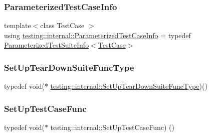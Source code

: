 \mbox{\label{namespacetesting_1_1internal_aac31682b6b41997d6cc610a5787dc8bc}} 
\subsubsection{\texorpdfstring{ParameterizedTestCaseInfo}{ParameterizedTestCaseInfo}}
{\footnotesize\ttfamily template$<$class Test\+Case $>$ \\
using \mbox{\hyperlink{classtesting_1_1internal_1_1_parameterized_test_case_info}{testing\+::internal\+::\+Parameterized\+Test\+Case\+Info}} = typedef \mbox{\hyperlink{classtesting_1_1internal_1_1_parameterized_test_suite_info}{Parameterized\+Test\+Suite\+Info}}$<$\mbox{\hyperlink{classtesting_1_1_test_case}{Test\+Case}}$>$}

\mbox{\label{namespacetesting_1_1internal_a754d337f5d643225115fb28f6b1d6fb1}} 
\subsubsection{\texorpdfstring{SetUpTearDownSuiteFuncType}{SetUpTearDownSuiteFuncType}}
{\footnotesize\ttfamily typedef void($\ast$ \mbox{\hyperlink{namespacetesting_1_1internal_a754d337f5d643225115fb28f6b1d6fb1}{testing\+::internal\+::\+Set\+Up\+Tear\+Down\+Suite\+Func\+Type}})()}

\mbox{\label{namespacetesting_1_1internal_a30037044c0b57cdd647c7e2e97cb2cff}} 
\subsubsection{\texorpdfstring{SetUpTestCaseFunc}{SetUpTestCaseFunc}}
{\footnotesize\ttfamily typedef void($\ast$ testing\+::internal\+::\+Set\+Up\+Test\+Case\+Func) ()}

